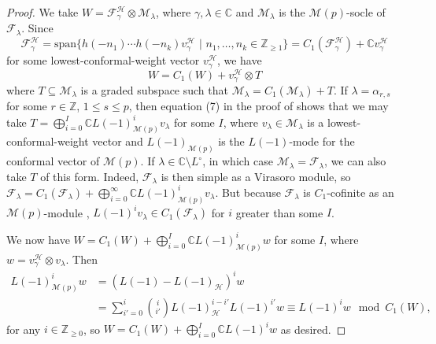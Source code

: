 \documentclass[11pt, reqno]{amsart}
\theoremstyle{definition}\newtheorem{defi}[thm]{Definition}
\theoremstyle{definition}\newtheorem{rem}[thm]{Remark}
\theoremstyle{definition}\newtheorem{exam}[thm]{Example}
\theoremstyle{definition}\newtheorem{assum}[thm]{Assumption}
\newcommand{\cH}{\mathcal{H}}
\newcommand{\cM}{\mathcal{M}}
\newcommand{\cF}{\mathcal{F}}
\newcommand{\CC}{\mathbb{C}}
\newcommand{\ZZ}{\mathbb{Z}}
\begin{document}
 \begin{proof}
 We take $W=\cF^\cH_\gamma\otimes\cM_\lambda$, where $\gamma,\lambda\in\CC$ and $\cM_\lambda$ is the $\cM(p)$-socle of $\cF_\lambda$. Since
 \begin{equation*}
 \cF^\cH_\gamma=\mathrm{span}\lbrace h(-n_1)\cdots h(-n_k) v^\cH_\gamma\,\,\vert\,\,n_1,\ldots,n_k\in\ZZ_{\geq 1}\rbrace = C_1(\cF^\cH_\gamma)+\CC v_\gamma^\cH
 \end{equation*}
 for some lowest-conformal-weight vector $v^\cH_\gamma$, we have
\begin{equation*}
W = C_1(W) + v^\cH_\gamma\otimes T
\end{equation*} 
 where $T\subseteq\cM_\lambda$ is a graded subspace such that $\cM_\lambda= C_1(\cM_\lambda)+T$. If $\lambda=\alpha_{r,s}$ for some $r\in\ZZ$, $1\leq s\leq p$, then equation (7) in the proof of \cite[Theorem 13]{CMR} shows that we may take $T=\bigoplus_{i=0}^I \CC L(-1)_{\cM(p)}^i v_\lambda$ for some $I$, where $v_\lambda\in\cM_\lambda$ is a lowest-conformal-weight vector and $L(-1)_{\cM(p)}$ is the $L(-1)$-mode for the conformal vector of $\cM(p)$. If $\lambda\in\CC\setminus L^\circ$, in which case $\cM_\lambda=\cF_\lambda$, we can also take $T$ of this form. Indeed, $\cF_\lambda$ is then simple as a Virasoro module, so $\cF_\lambda=C_1(\cF_\lambda)+\bigoplus_{i=0}^\infty \CC L(-1)^i_{\cM(p)} v_\lambda$. But because $\cF_\lambda$ is $C_1$-cofinite as an $\cM(p)$-module \cite[Theorem 13]{CMR}, $L(-1)^i v_\lambda\in C_1(\cF_\lambda)$ for $i$ greater than some $I$.
 
 We now have $W=C_1(W)+\bigoplus_{i=0}^I \CC L(-1)^i_{\cM(p)} w$ for some $I$, where $w=v^\cH_\gamma\otimes v_\lambda$. Then
 \begin{align*}
 L(-1)_{\cM(p)}^i w & =(L(-1)-L(-1)_\cH)^i w\nonumber\\
 & =\sum_{i'=0}^i \binom{i}{i'} L(-1)_\cH^{i-i'} L(-1)^{i'}w \equiv L(-1)^i w\mod C_1(W),
 \end{align*}
 for any $i\in\ZZ_{\geq 0}$, so $W=C_1(W)+\bigoplus_{i=0}^I \CC L(-1)^i w$ as desired.
 \end{proof}
 
 
 
\end{document}
